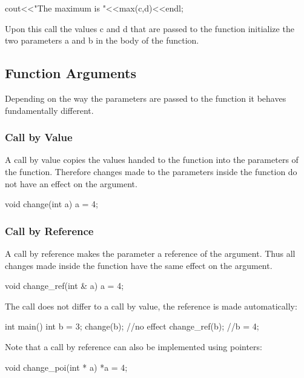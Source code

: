 \documentclass[10pt,a4paper]{scrartcl}
\begin{document}
\begin{multicols*}{2}
\begin{TPCpp}
cout<<"The maximum is "<<max(c,d)<<endl; 
\end{TPCpp}

Upon this call the values c and d that are passed to the function initialize the two parameters a and b in the body of the function.

\subsection{Function Arguments}
\label{sec:FunctionArguments}

Depending on the way the parameters are passed to the function it behaves fundamentally different.

\subsubsection{Call by Value}
\label{sec:CallByValue}

A call by value copies the values handed to the function into the parameters of the function. Therefore changes made to the parameters inside the function do not have an effect on the argument.

\begin{TPCpp}
void change(int a){
	a = 4;
}
\end{TPCpp}

\subsubsection{Call by Reference}
\label{sec:CallByReference}

A call by reference makes the parameter a reference of the argument. Thus all changes made inside the function have the same effect on the argument.

\begin{TPCpp}
void change_ref(int & a){
	a = 4;
}
\end{TPCpp}

The call does not differ to a call by value, the reference is made automatically:

\begin{TPCpp}
int main(){
	int b = 3;
	change(b); //no effect
	change_ref(b); //b = 4;
}
\end{TPCpp}

Note that a call by reference can also be implemented using pointers:

\begin{TPCpp}
void change_poi(int * a){
	*a = 4;
}
\end{TPCpp}


\end{multicols*}
\end{document}
